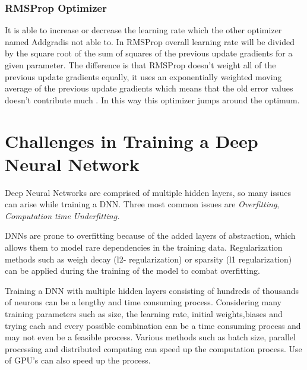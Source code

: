 \documentclass[12pt, a4paper]{report}
\begin{document}
\subsubsection{RMSProp Optimizer}\label{RMSProp}
It is able to increase or decrease the learning rate which the other optimizer named Addgradis not able to. In RMSProp overall learning rate will be divided by the square root of the sum of squares of the previous update gradients for a given parameter. The difference is that RMSProp doesn’t weight all of the previous update gradients equally, it uses an exponentially weighted moving average of the previous update gradients which means that the old error values doesn’t contribute much \cite{OptimizerGeneral}. In this way this optimizer jumps around the optimum.



\section{Challenges in Training a Deep Neural Network}\label{challenges}

Deep Neural Networks are comprised of multiple hidden layers, so many issues can arise while training a DNN. Three most common issues are \textit{Overfitting}, \textit{Computation time} \textit{Underfitting.}\\ \par

DNNs are prone to overfitting because of the added layers of abstraction, which allows them to model rare dependencies in the training data. Regularization methods such as weigh decay (l2- regularization) or sparsity (l1 regularization) can be applied during the training of the model to combat overfitting\cite{challenge1}.\\\par

Training a DNN with multiple hidden layers consisting of hundreds of thousands of neurons can be a lengthy and time consuming process. Considering many training parameters such as size, the learning rate, initial weights,biases and trying each and every possible combination can be a time consuming process and may not even be a feasible process\cite{challenge2}. Various methods such as batch size, parallel processing and distributed computing can speed up the computation process. Use of GPU's can also speed up the process.\\ \par
\end{document}
